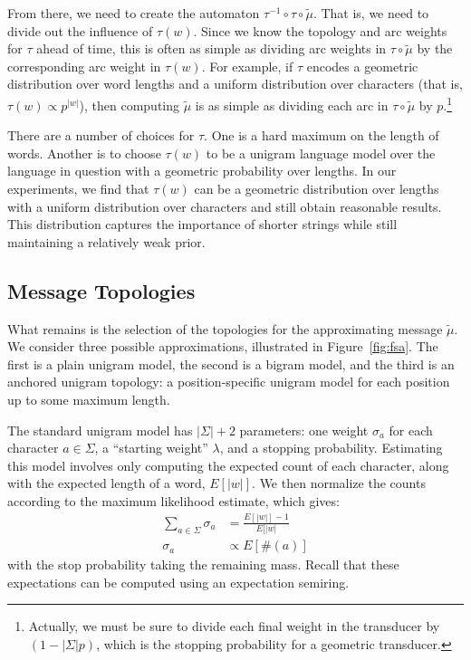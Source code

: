 \documentclass[11pt,a4paper]{article}
\begin{document}
From there, we need to create the automaton $\tau^{-1}
\circ\tau\circ\tilde\mu$. That is, we need to divide out the influence
of $\tau(w)$. Since we know the topology and arc weights for $\tau$
ahead of time, this is often as simple as dividing arc weights in
$\tau\circ\tilde\mu$ by the corresponding arc weight in $\tau(w)$.
For example, if $\tau$ encodes a geometric distribution over word
lengths and a uniform distribution over characters (that is, $\tau(w)
\propto {p^{|w|}}$), then computing $\tilde\mu$ is as simple as
dividing each arc in $\tau\circ\tilde\mu$ by $p$.\footnote{Actually,
we must be sure to divide each final weight in the transducer
by $(1-|\Sigma| p)$, which is the stopping probability for a geometric
transducer.}

There are a number of choices for $\tau$. One is a hard maximum on
the length of words. Another is to choose $\tau(w)$ to be a unigram
language model over the language in question with a geometric
probability over lengths. In our experiments, we find that $\tau(w)$
can be a geometric distribution over lengths with a uniform
distribution over characters and still obtain reasonable results.
This distribution captures the importance of shorter strings while
still maintaining a relatively weak prior.

\subsection{Message Topologies}

What remains is the selection of the topologies for the approximating
message $\tilde\mu$. We consider three possible approximations,
illustrated in Figure~\ref{fig:fsa}. The first is a plain unigram
model, the second is a bigram model, and the third is an anchored
unigram topology: a position-specific unigram model for each position
up to some maximum length.

The standard unigram model has $|\Sigma|+2$ parameters:
one weight $\sigma_a$ for each character $a \in \Sigma$, a ``starting
weight'' $\lambda$, and a stopping probability. Estimating this
model involves only computing the expected count of each character,
along with the expected length of a word, $E[|w|]$. We then normalize
the counts according to the maximum likelihood estimate, which
gives: 
\begin{equation*}
  \begin{split}
    \sum_{a\in\Sigma} \sigma_a &= \frac{E[|w|]-1}{E[|w|} \\
    \sigma_a &\propto E[\#(a)]
   \end{split}
 \end{equation*}
with the stop probability taking the remaining mass. Recall that
these expectations can be computed using an expectation semiring.
\end{document}
